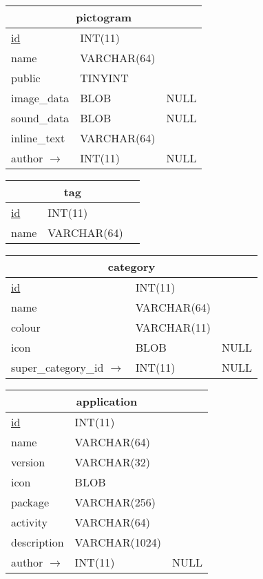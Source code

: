 \vspace{10pt}

\begin{tabular}{|l|l|c|}
\hline
\multicolumn{3}{|c|}{pictogram} \\
\hline
\underline{id} & INT(11) & \\
name & VARCHAR(64) & \\
public & TINYINT & \\
image\_data & BLOB & NULL \\
sound\_data & BLOB & NULL \\
inline\_text & VARCHAR(64) & \\
author $ \rightarrow $ & INT(11) & NULL \\
\hline
\end{tabular}

\vspace{10pt}

\begin{tabular}{|l|l|c|}
\hline
\multicolumn{3}{|c|}{tag} \\
\hline
\underline{id} & INT(11) & \\
name & VARCHAR(64) & \\
\hline
\end{tabular}

\vspace{10pt}

\begin{tabular}{|l|l|c|}
\hline
\multicolumn{3}{|c|}{category} \\
\hline
\underline{id} & INT(11) & \\
name & VARCHAR(64) & \\
colour & VARCHAR(11) & \\
icon & BLOB & NULL \\
super\_category\_id $ \rightarrow $ & INT(11) & NULL\\
\hline
\end{tabular}

\vspace{10pt}

\begin{tabular}{|l|l|c|}
\hline
\multicolumn{3}{|c|}{application} \\
\hline
\underline{id} & INT(11) & \\
name & VARCHAR(64) & \\
version & VARCHAR(32) & \\
icon & BLOB & \\
package & VARCHAR(256) & \\
activity & VARCHAR(64) & \\ 
description & VARCHAR(1024) & \\
author $ \rightarrow $ & INT(11) & NULL \\
\hline
\end{tabular}

